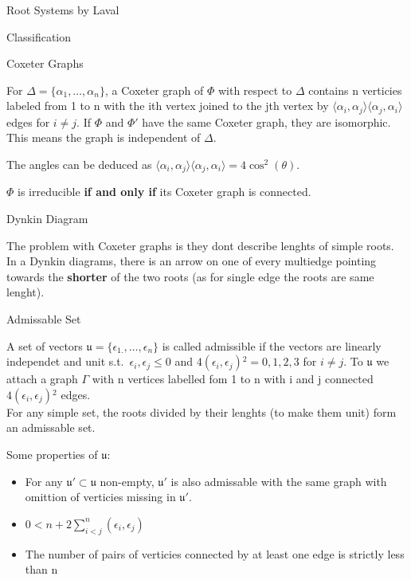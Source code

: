 \documentclass[12pt, letterpaper]{article}
\begin{document}
\begin{section}{Root Systems by Laval}
\begin{subsection}{Classification}
    \begin{subsubsection}{Coxeter Graphs}

      For \(\Delta = \{\alpha_{1}, \dots, \alpha_{n}\}\), a Coxeter graph of
      \(\Phi\) with respect to \(\Delta\) contains n verticies labeled from 1
      to n with the ith vertex joined to the jth vertex by \(\langle
      \alpha_{i}, \alpha_{j} \rangle \langle \alpha_{j}, \alpha_{i} \rangle\)
      edges for \(i \neq j\). If \(\Phi\) and \(\Phi'\) have the same Coxeter
      graph, they are isomorphic. This means the graph is independent of
      \(\Delta\).

      The angles can be deduced as \(\langle \alpha_{i}, \alpha_{j} \rangle
      \langle \alpha_{j}, \alpha_{i} \rangle = 4 \cos^{2}(\theta)\).

      \(\Phi\) is irreducible \textbf{if and only if} its Coxeter graph is
      connected.

    \end{subsubsection}

    \begin{subsubsection}{Dynkin Diagram}

      The problem with Coxeter graphs is they dont describe lenghts of simple
      roots. In a Dynkin diagrams, there is an arrow on one of every multiedge
      pointing towards the \textbf{shorter} of the two roots (as for single
      edge the roots are same lenght).

    \end{subsubsection}

    \begin{subsubsection}{Admissable Set}

      A set of vectors \(\mathfrak{u} = \{\epsilon_{1.}, \dots,
      \epsilon_{n}\}\) is called admissible if the vectors are linearly
      independet and unit s.t.\ \(\epsilon_{i}, \epsilon_{j} \leq 0\) and
      \(4(\epsilon_{i}, \epsilon_{j}){}^{2} = 0,1,2,3\) for \(i \neq j\). To
      \(\mathfrak{u}\) we attach a graph \(\Gamma\) with n vertices labelled
      fom 1 to n with i and j connected
      \(4(\epsilon_{i}, \epsilon_{j}){}^{2}\) edges.\\
      For any simple set, the roots divided by their lenghts (to make them
      unit) form an admissable set.

      Some properties of \(\mathfrak{u}\):
      \begin{itemize}
        \item For any \(\mathfrak{u}' \subset \mathfrak{u}\) non-empty,
              \(\mathfrak{u}'\) is also admissable with the same graph with
              omittion
              of verticies missing in \(\mathfrak{u}'\).
        \item \(0 < n + 2 \sum^{n}_{i < j} (\epsilon_{i}, \epsilon_{j})\)
        \item The number of pairs of verticies connected by at least one edge
              is strictly less than n
      \end{itemize}


\end{subsubsection}
\end{subsection}
\end{section}
\end{document}
